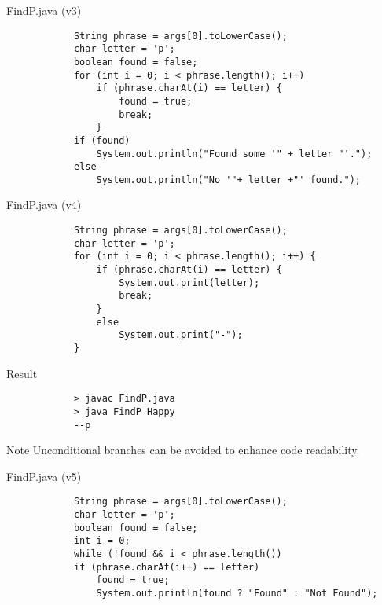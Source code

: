 \documentclass[10pt, compress]{beamer}
\begin{document}
\begin{slide}
	\begin{block}{FindP.java (v3)}
		\begin{verbatim}
			String phrase = args[0].toLowerCase();
			char letter = 'p';
			boolean found = false;
			for (int i = 0; i < phrase.length(); i++)
			    if (phrase.charAt(i) == letter) {
			        found = true;
			        break;
			    }
			if (found)
			    System.out.println("Found some '" + letter "'.");
			else
			    System.out.println("No '"+ letter +"' found.");
		\end{verbatim}
	\end{block}
\end{slide}

\begin{slide}
	\begin{block}{FindP.java (v4)}
		\begin{verbatim}
			String phrase = args[0].toLowerCase();
			char letter = 'p';
			for (int i = 0; i < phrase.length(); i++) {
			    if (phrase.charAt(i) == letter) {
			        System.out.print(letter);
			        break;
			    }
			    else
			        System.out.print("-");
			}
		\end{verbatim}
	\end{block}
	\begin{block}{Result}
		\begin{verbatim}
			> javac FindP.java
			> java FindP Happy
			--p
		\end{verbatim}
	\end{block}
\end{slide}

\begin{slide}
	\begin{block}{Note}
	Unconditional branches can be avoided to enhance code readability.
	\end{block}
	\begin{block}{FindP.java (v5)}
		\begin{verbatim}
			String phrase = args[0].toLowerCase();
			char letter = 'p';
			boolean found = false;
			int i = 0;
			while (!found && i < phrase.length())
			if (phrase.charAt(i++) == letter)
			    found = true;
			    System.out.println(found ? "Found" : "Not Found");
		\end{verbatim}
	\end{block}
\end{slide}
\end{document}
